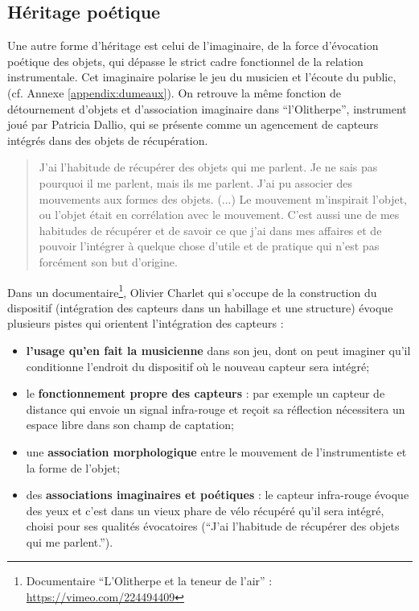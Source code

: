 \subsection{Héritage poétique}

\noindent Une autre forme d'héritage est celui de l'imaginaire, de la force d'évocation poétique des objets, qui dépasse le strict cadre fonctionnel de la relation instrumentale. Cet imaginaire polarise le jeu du musicien et l'écoute du public,  (cf. Annexe \ref{appendix:dumeaux}). On retrouve la même fonction de détournement d'objets et d'association imaginaire dans ``l'Olitherpe'', instrument joué par Patricia Dallio, qui se présente comme un agencement de capteurs intégrés dans des objets de récupération. 

\begin{quotation}
	J'ai l'habitude de récupérer des objets qui me parlent. Je ne sais pas pourquoi il me parlent, mais ils me parlent. J'ai pu associer des mouvements aux formes des objets. (...) Le mouvement m'inspirait l'objet, ou l'objet était en corrélation avec le mouvement. C'est aussi une de mes habitudes de récupérer et de savoir ce que j'ai dans mes affaires et de pouvoir l'intégrer à quelque chose d'utile et de pratique qui n'est pas forcément son but d'origine.
\end{quotation}

\noindent Dans un documentaire\footnote{Documentaire ``L'Olitherpe et la teneur de l'air'' : \url{https://vimeo.com/224494409}}, Olivier Charlet qui s'occupe de la construction du dispositif (intégration des capteurs dans un habillage et une structure) évoque plusieurs pistes qui orientent l'intégration des capteurs : 
\vspace{-1em}
\begin{itemize}[noitemsep]
\item \textbf{l'usage qu'en fait la musicienne} dans son jeu, dont on peut imaginer qu'il conditionne l'endroit du dispositif où le nouveau capteur sera intégré; 
\item le \textbf{fonctionnement propre des capteurs} : par exemple un capteur de distance qui envoie un signal infra-rouge et reçoit sa réflection nécessitera un espace libre dans son champ de captation;
\item une \textbf{association morphologique} entre le mouvement de l'instrumentiste et la forme de l'objet;
\item des \textbf{associations imaginaires et poétiques} : le capteur infra-rouge évoque des yeux et c'est dans un vieux phare de vélo récupéré qu'il sera intégré, choisi pour ses qualités évocatoires (``J'ai l'habitude de récupérer des objets qui me parlent.'').
\end{itemize}


